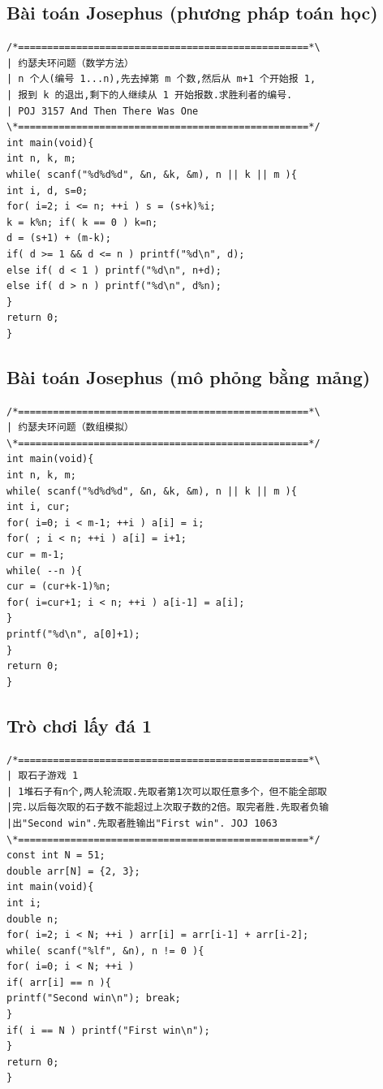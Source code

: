 \documentclass[11pt]{article}
\begin{document}
\subsection{Bài toán Josephus (phương pháp toán học)}

\begingroup
\scriptsize
\begin{verbatim}
/*==================================================*\
| 约瑟夫环问题（数学方法）
| n 个人(编号 1...n),先去掉第 m 个数,然后从 m+1 个开始报 1,
| 报到 k 的退出,剩下的人继续从 1 开始报数.求胜利者的编号.
| POJ 3157 And Then There Was One
\*==================================================*/
int main(void){
int n, k, m;
while( scanf("%d%d%d", &n, &k, &m), n || k || m ){
int i, d, s=0;
for( i=2; i <= n; ++i ) s = (s+k)%i;
k = k%n; if( k == 0 ) k=n;
d = (s+1) + (m-k);
if( d >= 1 && d <= n ) printf("%d\n", d);
else if( d < 1 ) printf("%d\n", n+d);
else if( d > n ) printf("%d\n", d%n);
}
return 0;
}
\end{verbatim}
\endgroup

\subsection{Bài toán Josephus (mô phỏng bằng mảng)}

\begingroup
\scriptsize
\begin{verbatim}
/*==================================================*\
| 约瑟夫环问题（数组模拟）
\*==================================================*/
int main(void){
int n, k, m;
while( scanf("%d%d%d", &n, &k, &m), n || k || m ){
int i, cur;
for( i=0; i < m-1; ++i ) a[i] = i;
for( ; i < n; ++i ) a[i] = i+1;
cur = m-1;
while( --n ){
cur = (cur+k-1)%n;
for( i=cur+1; i < n; ++i ) a[i-1] = a[i];
}
printf("%d\n", a[0]+1);
}
return 0;
}
\end{verbatim}
\endgroup

\subsection{Trò chơi lấy đá 1}

\begingroup
\scriptsize
\begin{verbatim}
/*==================================================*\
| 取石子游戏 1
| 1堆石子有n个,两人轮流取.先取者第1次可以取任意多个，但不能全部取
|完.以后每次取的石子数不能超过上次取子数的2倍。取完者胜.先取者负输
|出"Second win".先取者胜输出"First win". JOJ 1063
\*==================================================*/
const int N = 51;
double arr[N] = {2, 3};
int main(void){
int i;
double n;
for( i=2; i < N; ++i ) arr[i] = arr[i-1] + arr[i-2];
while( scanf("%lf", &n), n != 0 ){
for( i=0; i < N; ++i )
if( arr[i] == n ){
printf("Second win\n"); break;
}
if( i == N ) printf("First win\n");
}
return 0;
}
\end{verbatim}
\endgroup
\end{document}
